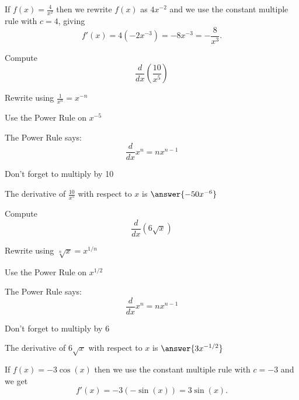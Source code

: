 \documentclass[handout]{ximera}
\begin{document}
\begin{example} %
 If $f(x) = \frac{4}{x^2}$ then we rewrite $f(x)$ as $4x^{-2}$  and we use the constant multiple rule with $c = 4$, 
giving 
\[f'(x) = 4 (-2x^{-3}) = -8x^{-3} = -\frac{8}{x^3}.
\]
\end{example}

\begin{problem} %
  Compute 
  \[
  \frac{d}{dx} \left(\frac{10}{x^5}\right)
  \]
  
    \begin{hint}
		  Rewrite using $\frac{1}{x^n} = x^{-n}$
		\end{hint}
		\begin{hint}
      Use the Power Rule on $x^{-5}$
    \end{hint}
    \begin{hint}
      The Power Rule says:
      \[
      \frac{d}{dx} x^n = nx^{n-1}
      \]
    \end{hint}
		\begin{hint}
		  Don't forget to multiply by 10
		\end{hint}
		
		The derivative of $\frac{10}{x^5}$ with respect to $x$ is
		 $\answer{-50x^{-6}}$
	
\end{problem}


\begin{problem} %
  Compute 
  \[
  \frac{d}{dx} \left(6\sqrt x\right)
  \]
  
    \begin{hint}
		  Rewrite using $\sqrt[n] x = x^{1/n}$
		\end{hint}
		\begin{hint}
      Use the Power Rule on $x^{1/2}$
    \end{hint}
    \begin{hint}
      The Power Rule says:
      \[
      \frac{d}{dx} x^n = nx^{n-1}
      \]
    \end{hint}
		\begin{hint}
		  Don't forget to multiply by 6
		\end{hint}
		
		The derivative of $6\sqrt x$ with respect to $x$ is
		 $\answer{3x^{-1/2}}$
	
\end{problem}


\begin{example} %
 If $f(x) = -3\cos(x)$ then we use the constant multiple rule with $c = -3$ and we get 
\[
f'(x) = -3(-\sin(x)) = 3\sin(x).
\]
\end{example}
\end{document}

